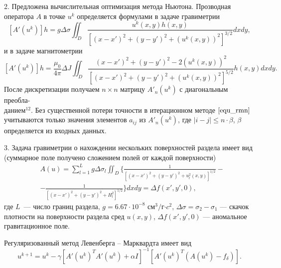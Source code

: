 \documentclass[%
autoref,     %
href,        %
colorlinks,  %
]{disser}
\begin{document}
2. Предложена вычислительная оптимизация метода Ньютона. Прозводная оператора $A$ в точке $u^k$ определяется формулами в задаче гравиметрии
$$ [A'(u^k)]h=g\Delta\sigma\iint_{D} \frac{u^k(x,y)h(x,y)}{[(x-x')^2+(y-y')^2+(u^k(x,y))^2]^{3/2}}dxdy,$$
и в задаче магнитометрии
$$ [A'(u^k)]h=\frac{\mu_0}{4\pi}\Delta J\iint_{D} \frac{(x-x')^2+(y-y')^2-2(u^k(x,y))^2}{[(x-x')^2+(y-y')^2+(u^k(x,y))^2]^{5/2}}h(x,y) dxdy.$$
После дискретизации получаем $n\times n$ матрицу $A'_n(u^k)$ с диагональным преобла-\\данием$^{12}$. Без существенной потери точности в итерационном методе $\eqref{equ_rmn}$ учитываются только значения элементов $a_{ij}$ из $A'_n(u^k)$, где $|i-j|\leqslant n\cdot\beta$, $\beta$ определяется из входных данных.
{\scriptsize
	\let\thefootnote\relax\let\thefootnote\relax{}
	}

3. Задача гравиметрии о нахождении нескольких поверхностей раздела имеет вид (суммарное поле получено сложением полей от каждой поверхности)
\begin{equation}\label{equ_grav_multi}
		\begin{aligned}
		& A(u)=\sum_{l=1}^{L}g\Delta\sigma_l
		\iint_D\bigg\{\frac{1}{[(x-x')^2+(y-y')^2+u_l^2(x,y)]^{1/2}} - \\
		&-\frac{1}{[(x-x')^2+(y-y')^2+H_l^2]^{1/2}}\bigg\}dxdy=\Delta f(x',y',0),
		\end{aligned}
\end{equation}		
где $L$~--- число границ раздела, $g=6.67\cdot10^{-8}$ см$^3/$г$\cdot c^2$, $\Delta\sigma=\sigma_2-\sigma_1$ --- скачок плотности на поверхности раздела сред $u(x,y)$, $\Delta f(x',y',0)$ --- аномальное гравитационное поле.

Регуляризованный метод Левенберга -- Марквардта имеет вид 
$$u^{k+1}=u^k-\gamma[A'(u^k)^T A'(u^k)+\alpha I]^{-1} [A'(u^k)^T(A(u^k)-f_\delta)].$$
\end{document}
